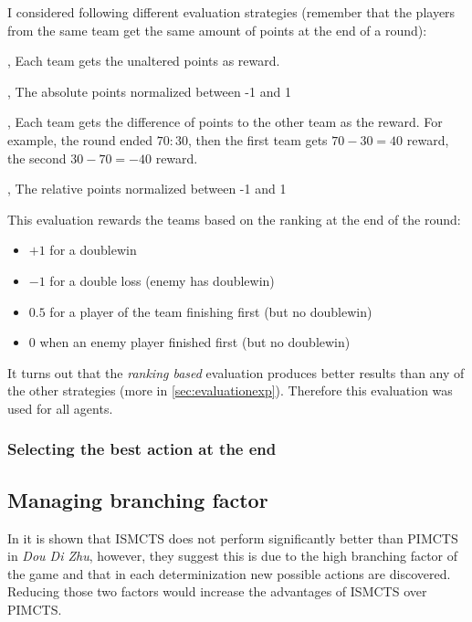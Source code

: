 I considered following different evaluation strategies (remember that the players from the same team get the same amount of points at the end of a round):
\begin{description}
    \vspace{-10px}
    \item[Absolute Points], Each team gets the unaltered points as reward.
    \item[Absolute Normalized Points], The absolute points normalized between -1 and 1
    \item[Relative Points], Each team gets the difference of points to the other team as the reward. For example, the round ended $70:30$, then the first team gets $70 - 30 = 40$ reward, the second $30 - 70 = -40$ reward.
    \item[Relative Normalized Points], The relative points normalized between -1 and 1
    \item[Ranking Based] This evaluation rewards the teams based on the ranking at the end of the round:
        \begin{itemize}
            \vspace{-10px}
            \item $+1$ for a doublewin
            \item $-1$ for a double loss (enemy has doublewin)
            \item $0.5$ for a player of the team finishing first (but no doublewin)
            \item $0$ when an enemy player finished first (but no doublewin)
        \end{itemize}
\end{description}

It turns out that the \textit{ranking based} evaluation produces better results than any of the other strategies (more in \ref{sec:evaluationexp}). Therefore this evaluation was used for all agents.

\subsubsection{Selecting the best action at the end}


\subsection{Managing branching factor}
In \cite{ismcts} it is shown that ISMCTS does not perform significantly better than PIMCTS in \textit{Dou Di Zhu}, however, they suggest this is due to the high branching factor of the game and that in each determinization new possible actions are discovered. Reducing those two factors would increase the advantages of ISMCTS over PIMCTS.

